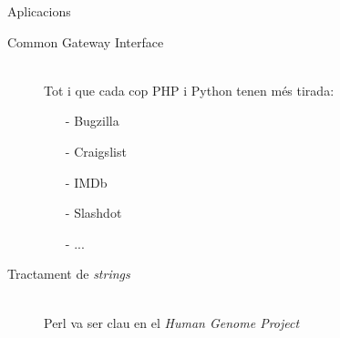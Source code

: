 \documentclass{beamer}
\begin{document}
\begin{frame}{Aplicacions}
  \begin{description}
    \item[Common Gateway Interface] \hfill \\
      Tot i que cada cop PHP i Python tenen més tirada:
      \pause
       \begin{itemize}
         \item[-] Bugzilla
         \item[-] Craigslist
         \item[-] IMDb
         \item[-] Slashdot
         \item[-] ...
       \end{itemize}
     \item[Tractament de \emph{strings}] \hfill \\
         Perl va ser clau en el \emph{Human Genome Project}
  \end{description}
\end{frame}
\end{document}
